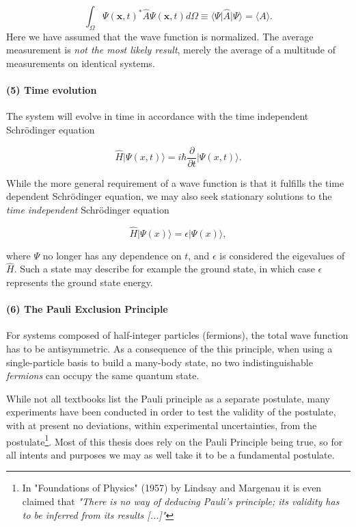  $$ \int_{\Omega} \Psi(\mathbf{x},t)^* \hat{A} \Psi(\mathbf{x},t) d\Omega \equiv \langle  \Psi \vert  \hat{A} \vert \Psi \rangle  =  \langle{ A} \rangle.$$
Here we have assumed that the wave function is normalized.
The average measurement is \emph{not the most likely result}, merely the average of a multitude of measurements on identical systems. 

\paragraph{(5) Time evolution} The system will evolve in time in accordance with the time independent Schrödinger equation

\begin{equation}
\hat{H} \vert \Psi(x,t) \rangle = i\hbar \frac{\partial}{\partial t} \vert \Psi(x,t) \rangle .
\label{eqn:tisl}
\end{equation}

While the more general requirement of a wave function is that it fulfills the time dependent Schrödinger equation, we may also seek stationary solutions to the \emph{time independent} Schrödinger equation

\begin{equation}
\hat{H} \vert \Psi(x) \rangle = \epsilon \vert \Psi(x) \rangle,
\label{eqn:tusl}
\end{equation}

where $\Psi $ no longer has any dependence on $t$, and $\epsilon$ is considered the eigevalues of $\hat{H}$. Such a state may describe for example the ground state, in which case $\epsilon$ represents the ground state energy.

\paragraph{(6) The Pauli Exclusion Principle} For systems composed of half-integer particles (fermions), the total wave function has to be antisymmetric. As a consequence of the this principle, when using a single-particle basis to build a many-body state, no two indistinguishable \emph{fermions} can occupy the same quantum state. 

While not all textbooks list the Pauli principle as a separate postulate, many experiments have been conducted in order to test the validity of the postulate, with at present no deviations, within experimental uncertainties, from the postulate\footnote{In "Foundations of Physics" (1957) by Lindsay and Margenau \cite{lindsay} it is even claimed that \emph{"There is no way of deducing Pauli’s principle; its validity has to be inferred from its results [...]"}}. Most of this thesis does rely on the Pauli Principle being true, so for all intents and purposes we may as well take it to be a fundamental postulate.



